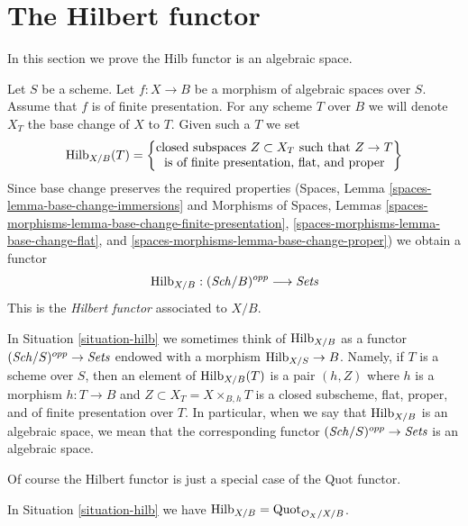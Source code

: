 \section{The Hilbert functor}
\label{section-hilb}

\noindent
In this section we prove the Hilb functor is an algebraic space.

\begin{situation}
\label{situation-hilb}
Let $S$ be a scheme. Let $f : X \to B$ be a morphism of
algebraic spaces over $S$. Assume that $f$ is of finite presentation.
For any scheme $T$ over $B$ we will denote $X_T$ the base change of
$X$ to $T$. Given such a $T$ we set
$$
\mathrm{Hilb}_{X/B}(T) =
\left\{
\begin{matrix}
\text{closed subspaces }Z \subset X_T\text{ such that }Z \to T\\
\text{is of finite presentation, flat, and proper}
\end{matrix}
\right\}
$$
Since base change preserves the required properties
(Spaces, Lemma \ref{spaces-lemma-base-change-immersions} and
Morphisms of Spaces, Lemmas
\ref{spaces-morphisms-lemma-base-change-finite-presentation},
\ref{spaces-morphisms-lemma-base-change-flat}, and
\ref{spaces-morphisms-lemma-base-change-proper})
we obtain a functor
\begin{equation}
\label{equation-hilb}
\mathrm{Hilb}_{X/B} : (\mathit{Sch}/B)^{opp} \longrightarrow \textit{Sets}
\end{equation}
This is the {\it Hilbert functor} associated to $X/B$.
\end{situation}

\noindent
In Situation \ref{situation-hilb} we sometimes think of $\mathrm{Hilb}_{X/B}$
as a functor $(\mathit{Sch}/S)^{opp} \to \textit{Sets}$ endowed with a morphism
$\mathrm{Hilb}_{X/S} \to B$. Namely, if $T$ is a scheme over $S$, then an element
of $\mathrm{Hilb}_{X/B}(T)$ is a pair $(h, Z)$
where $h$ is a morphism $h : T \to B$
and $Z \subset X_T = X \times_{B, h} T$
is a closed subscheme, flat, proper, and of finite
presentation over $T$. In particular, when we say
that $\mathrm{Hilb}_{X/B}$ is an algebraic space, we mean that the
corresponding functor $(\mathit{Sch}/S)^{opp} \to \textit{Sets}$ is an algebraic space.

\medskip\noindent
Of course the Hilbert functor is just a special case of the
Quot functor.

\begin{lemma}
\label{lemma-hilb-is-quot}
In Situation \ref{situation-hilb} we have
$\mathrm{Hilb}_{X/B} = \mathrm{Quot}_{\mathcal{O}_X/X/B}$.
\end{lemma}

